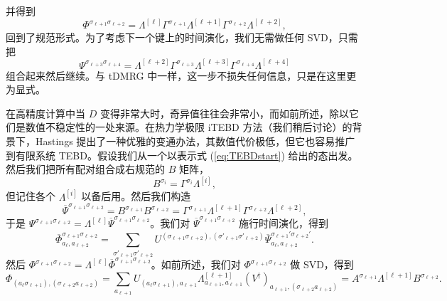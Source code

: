 \documentclass[a4paper,10pt,oneside,onecolumn,1p,times]{elsarticle}
\begin{document}
并得到
\begin{equation}
\Phi^{\sigma_{\ell+1}\sigma_{\ell+2}} = \Lambda^{[\ell]}  \Gamma^{\sigma_{\ell+1}} 
 \Lambda^{[\ell+1]} \Gamma^{\sigma_{\ell+2}}  \Lambda^{[\ell+2]} ,
\end{equation}
回到了规范形式。为了考虑下一个键上的时间演化，我们无需做任何 SVD，只需把
\begin{equation}
\Psi^{\sigma_{\ell+3} \sigma_{\ell+4}} = \Lambda^{[\ell+2]}  \Gamma^{\sigma_{\ell+3}} \Lambda^{[\ell+3]}
\Gamma^{\sigma_{\ell+4}} \Lambda^{[\ell+4]}  
\end{equation}
组合起来然后继续。与 tDMRG 中一样，这一步不损失任何信息，只是在这里更为显式。

在高精度计算中当 $D$ 变得非常大时，奇异值往往会非常小，而如前所述，除以它们是数值不稳定性的一处来源。在热力学极限 iTEBD 方法（我们稍后讨论）的背景下，Hastings 提出了一种优雅的变通办法，其数值代价极低\cite{Hastings09}，但它也容易推广到有限系统 TEBD。假设我们从一个以表示式 (\ref{eq:TEBDstart}) 给出的态出发。然后我们把所有配对组合成右规范的 $B$ 矩阵，
\begin{equation}
B^{\sigma_i} = \Gamma^{\sigma_i} \Lambda^{[i]} ,
\end{equation}
但记住各个 $\Lambda^{[i]}$ 以备后用。然后我们构造
\begin{equation}
\overline{\Psi}^{\sigma_{\ell+1} \sigma_{\ell+2}} = B^{\sigma_{\ell+1}} B^{\sigma_{\ell+2}} =  \Gamma^{\sigma_{\ell+1}} \Lambda^{[\ell+1]}
\Gamma^{\sigma_{\ell+2}} \Lambda^{[\ell+2]} ,
\end{equation}
于是 $\Psi^{\sigma_{\ell+1} \sigma_{\ell+2}} = \Lambda^{[\ell]} \overline{\Psi}^{\sigma_{\ell+1} \sigma_{\ell+2}}$。我们对 $\overline{\Psi}^{\sigma_{\ell+1} \sigma_{\ell+2}}$ 施行时间演化，得到
\begin{equation}
\overline{\Phi}^{\sigma_{\ell+1}\sigma_{\ell+2}}_{a_\ell, a_{\ell+2}} = \sum_{\sigma'_{\ell+1} \sigma'_{\ell+2}}
U^{(\sigma_{\ell+1} \sigma_{\ell+2}), (\sigma'_{\ell+1} \sigma'_{\ell+2})}  \overline{\Psi}^{\sigma_{\ell+1}'\sigma_{\ell+2}'}_{a_\ell, a_{\ell+2}} .
\end{equation} 
然后 $\Phi^{\sigma_{\ell+1} \sigma_{\ell+2}} = \Lambda^{[\ell]} \overline{\Phi}^{\sigma_{\ell+1} \sigma_{\ell+2}}$。如前所述，我们对 $\Phi^{\sigma_{\ell+1} \sigma_{\ell+2}}$ 做 SVD，得到 
\begin{equation}
\Phi_{(a_\ell \sigma_{\ell+1}), (\sigma_{\ell+2} a_{\ell+2})} = \sum_{a_{\ell+1}} U_{(a_\ell \sigma_{\ell+1}),a_{\ell+1}} \Lambda^{[\ell+1]}_{a_{\ell+1},a_{\ell+1}} (V^\dagger)_{a_{\ell+1}, (\sigma_{\ell+2} a_{\ell+2})} = A^{\sigma_{\ell+1}} \Lambda^{[\ell+1]} B^{\sigma_{\ell+2}} .
\end{equation}
\end{document}
